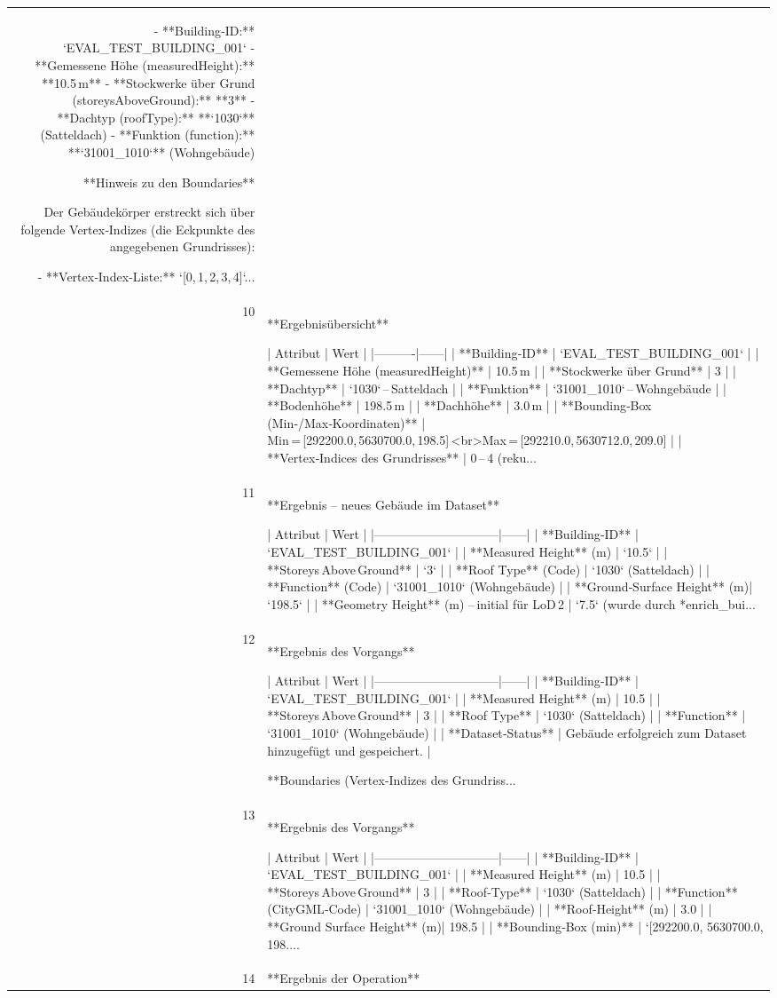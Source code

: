 \documentclass[a4paper,11pt]{article}
\begin{document}
\begin{table}[ht]
\begin{tabular}{r p{12cm}}
- **Building‑ID:** `EVAL\_TEST\_BUILDING\_001`  
- **Gemessene Höhe (measuredHeight):** **10.5 m**  
- **Stockwerke über Grund (storeysAboveGround):** **3**  
- **Dachtyp (roofType):** **`1030`** (Satteldach)  
- **Funktion (function):** **`31001\_1010`** (Wohngebäude)  

**Hinweis zu den Boundaries**  

Der Gebäudekörper erstreckt sich über folgende Vertex‑Indizes (die Eckpunkte des angegebenen Grundrisses):  

- **Vertex‑Index‑Liste:** `[0, 1, 2, 3, 4]`... \\
10 & **Ergebnisübersicht**

| Attribut | Wert |
|----------|------|
| **Building‑ID** | `EVAL\_TEST\_BUILDING\_001` |
| **Gemessene Höhe (measuredHeight)** | 10.5 m |
| **Stockwerke über Grund** | 3 |
| **Dachtyp** | `1030` – Satteldach |
| **Funktion** | `31001\_1010` – Wohngebäude |
| **Bodenhöhe** | 198.5 m |
| **Dachhöhe** | 3.0 m |
| **Bounding‑Box (Min‑/Max‑Koordinaten)** | Min = [292200.0, 5630700.0, 198.5] <br>Max = [292210.0, 5630712.0, 209.0] |
| **Vertex‑Indices des Grundrisses** | 0 – 4 (reku... \\
11 & **Ergebnis – neues Gebäude im Dataset**

| Attribut                     | Wert |
|------------------------------|------|
| **Building‑ID**              | `EVAL\_TEST\_BUILDING\_001` |
| **Measured Height** (m)      | `10.5` |
| **Storeys Above Ground**     | `3` |
| **Roof Type** (Code)         | `1030` (Satteldach) |
| **Function** (Code)          | `31001\_1010` (Wohngebäude) |
| **Ground‑Surface Height** (m)| `198.5` |
| **Geometry Height** (m) – initial für LoD 2 | `7.5` (wurde durch *enrich\_bui... \\
12 & **Ergebnis des Vorgangs**

| Attribut                     | Wert |
|------------------------------|------|
| **Building‑ID**              | `EVAL\_TEST\_BUILDING\_001` |
| **Measured Height** (m)      | 10.5 |
| **Storeys Above Ground**     | 3 |
| **Roof Type**                | `1030` (Satteldach) |
| **Function**                 | `31001\_1010` (Wohngebäude) |
| **Dataset‑Status**           | Gebäude erfolgreich zum Dataset hinzugefügt und gespeichert. |

**Boundaries (Vertex‑Indizes des Grundriss... \\
13 & **Ergebnis des Vorgangs**

| Attribut                     | Wert |
|------------------------------|------|
| **Building‑ID**              | `EVAL\_TEST\_BUILDING\_001` |
| **Measured Height** (m)      | 10.5 |
| **Storeys Above Ground**     | 3 |
| **Roof‑Type**                | `1030` (Satteldach) |
| **Function** (CityGML‑Code) | `31001\_1010` (Wohngebäude) |
| **Roof‑Height** (m)          | 3.0 |
| **Ground Surface Height** (m)| 198.5 |
| **Bounding‑Box (min)**       | `[292200.0, 5630700.0, 198.... \\
14 & **Ergebnis der Operation**


\end{tabular}
\end{table}
\end{document}

